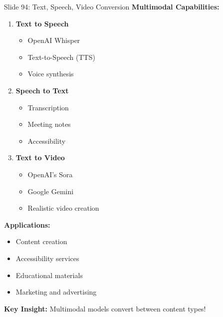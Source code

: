 \documentclass[8pt]{beamer}
\begin{document}
	\begin{frame}{Slide 94: Text, Speech, Video Conversion}
		\fontsize{6.5}{7.5}\selectfont
		\textbf{Multimodal Capabilities:}
		\begin{enumerate}
			\item \textbf{Text to Speech}
			\begin{itemize}
				\item OpenAI Whisper
				\item Text-to-Speech (TTS)
				\item Voice synthesis
			\end{itemize}
			\item \textbf{Speech to Text}
			\begin{itemize}
				\item Transcription
				\item Meeting notes
				\item Accessibility
			\end{itemize}
			\item \textbf{Text to Video}
			\begin{itemize}
				\item OpenAI's Sora
				\item Google Gemini
				\item Realistic video creation
			\end{itemize}
		\end{enumerate}
		
		\vspace{0.1cm}
		\textbf{Applications:}
		\begin{itemize}
			\item Content creation
			\item Accessibility services
			\item Educational materials
			\item Marketing and advertising
		\end{itemize}
		
		\textcolor{myblue}{\textbf{Key Insight:}} Multimodal models convert between content types!
	\end{frame}
	
\end{document}
